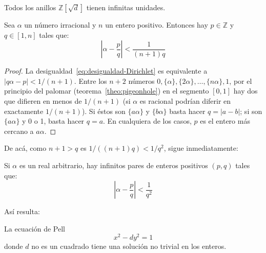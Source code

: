   Todos los anillos \(\mathbb{Z}[\sqrt{d}]\)
  tienen infinitas unidades.
  \begin{theorem}[Dirichlet]
    \label{theo:Dirichlet}
    Sea \(\alpha\) un número irracional%
    y \(n\) un entero positivo.
    Entonces hay \(p \in \mathbb{Z}\) y \(q \in [1, n]\)
    tales que:
    \begin{equation}
      \label{eq:desigualdad-Dirichlet}
      \left\lvert \alpha - \frac{p}{q} \right\rvert < \frac{1}{(n + 1) q}
    \end{equation}
  \end{theorem}
  \begin{proof}
    La desigualdad~\eqref{eq:desigualdad-Dirichlet}
    es equivalente a \(\lvert q \alpha - p \rvert < 1 / (n + 1)\).
    Entre los \(n + 2\) números
      \(0, \{\alpha\}, \{2 \alpha\}, \dotsc, \{n \alpha\}, 1\),
    por el principio del palomar%
    (teorema~\ref{theo:pigeonhole})
    en el segmento \([0, 1]\) hay dos que difieren en menos de \(1 / (n + 1)\)
    (si \(\alpha\) es racional podrían diferir en exactamente \(1 / (n + 1)\)).
    Si éstos son \(\{a \alpha\}\) y \(\{b \alpha\}\)
    basta hacer \(q = \lvert a - b \rvert\);
    si son \(\{a \alpha\}\) y 0 o 1,
    basta hacer \(q = a\).
    En cualquiera de los casos,
    \(p\) es el entero más cercano a \(a \alpha\).
  \end{proof}
  De acá,
  como \(n + 1 > q\) es \(1 / ((n + 1) q) < 1 / q^2\),
  sigue inmediatamente:
  \begin{corollary}
    \label{cor:Dirichlet}
    Si \(\alpha\) es un real arbitrario,
    hay infinitos pares de enteros positivos \((p, q)\) tales que:
    \begin{equation*}
       \left\lvert \alpha - \frac{p}{q} \right\rvert
	 < \frac{1}{q^2}
    \end{equation*}
  \end{corollary}
  Así resulta:
  \begin{theorem}
    \label{theo:Pell-soluble}
    La ecuación de Pell
    \begin{equation*}
      x^2 - d y^2
	= 1
    \end{equation*}
    donde \(d\) no es un cuadrado
    tiene una solución no trivial en los enteros.
  \end{theorem}
